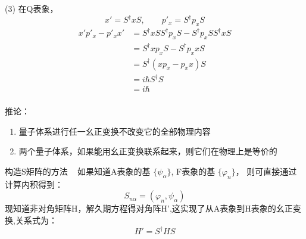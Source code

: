 \begin{frame} 

    (3) 在Q表象，$$ x'= S^\dagger x S, \qquad p'_x= S^\dagger p_x S $$
    \begin{equation*}
        \begin{split}
        x'p'_x-p'_x x' &= S^\dagger x S S^\dagger p_x S - S^\dagger p_x S S^\dagger x S \\
        &= S^\dagger x p_x S - S^\dagger p_x x S \\
        &= S^\dagger (x p_x -  p_x x) S \\
        &= i\hbar S^\dagger S \\
        &= i\hbar \\
        \end{split} 
    \end{equation*} 
\end{frame}  

\begin{frame}
    \begin{tcolorbox2}{推论：}
       \begin{enumerate}
           \item 量子体系进行任一幺正变换不改变它的全部物理内容
           \item 两个量子体系，如果能用幺正变换联系起来，则它们在物理上是等价的
       \end{enumerate} 
    \end{tcolorbox2}
\end{frame}

\begin{frame}{构造S矩阵的方法}
     \解~ 如果知道A表象的基 $\{\psi_\alpha \}$, F表象的基 $ \{\varphi_n \}$， 则可直接通过计算内积得到：
     $$ S_{n\alpha} =(\varphi_n, \psi_\alpha) $$
     现知道非对角矩阵H，解久期方程得对角阵H',这实现了从A表象到H表象的幺正变换,关系式为：
     $$ H'=S^\dagger H S$$
\end{frame}  

